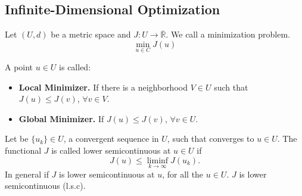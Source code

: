 \subsection{Infinite-Dimensional Optimization} 
Let $(U,d)$ be a metric space and $J:U\rightarrow \overline{\mathbb{R}}$. We call a minimization problem.
\[
	\min_{u\in C} J(u)
\]


\begin{definition}
	A point $u\in U$ is called:
	\begin{itemize}
		\item \textbf{Local Minimizer.} If there is a neighborhood $V \in U$ such that $J(u) \leq J(v)$, $\forall v \in V$.
		\item \textbf{Global Minimizer. } If $J(u)\leq J(v)$, $\forall v \in U$.
	\end{itemize}
\end{definition}
\begin{definition}
	Let be $\{u_k\} \in U$, a convergent sequence in $U$, such that converges to $u \in U$. The functional $J$ is called lower semicontinuous at $u\in U$ if
	\[
		J(u) \leq \liminf_{k\rightarrow\infty} J(u_k).
	\]
	In general if $J$ is lower semicontinuous at $u$, for all the $u \in U$. $J$ is lower semicontinuous (l.s.c). 
\end{definition}

